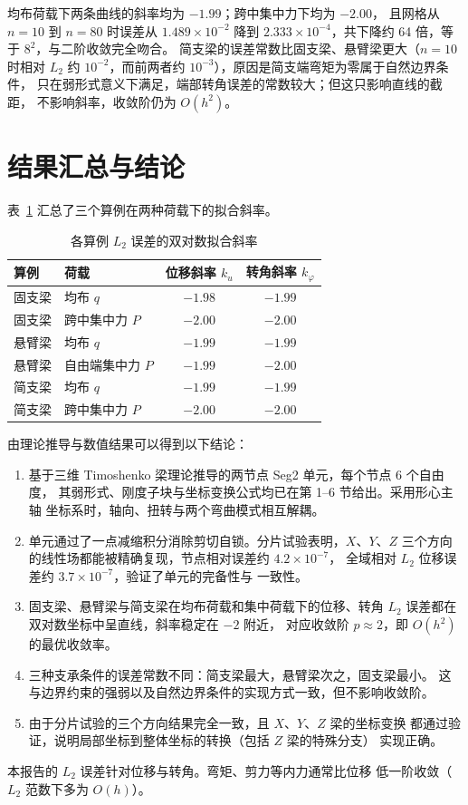 \documentclass[UTF8,a4paper,11pt]{ctexart}
\begin{document}
均布荷载下两条曲线的斜率均为 $-1.99$；跨中集中力下均为 $-2.00$，
且网格从 $n=10$ 到 $n=80$ 时误差从 $1.489\times10^{-2}$ 降到
$2.333\times10^{-4}$，共下降约 64 倍，等于 $8^2$，与二阶收敛完全吻合。
简支梁的误差常数比固支梁、悬臂梁更大（$n=10$ 时相对 $L_2$ 约
$10^{-2}$，而前两者约 $10^{-3}$），原因是简支端弯矩为零属于自然边界条件，
只在弱形式意义下满足，端部转角误差的常数较大；但这只影响直线的截距，
不影响斜率，收敛阶仍为 $O(h^2)$。

\section{结果汇总与结论}

表~\ref{tab:summary} 汇总了三个算例在两种荷载下的拟合斜率。

\begin{table}[H]
\centering
\caption{各算例 $L_2$ 误差的双对数拟合斜率}
\label{tab:summary}
\begin{tabular}{llcc}
\toprule
算例 & 荷载 & 位移斜率 $k_u$ & 转角斜率 $k_\varphi$\\
\midrule
固支梁 & 均布 $q$ & $-1.98$ & $-1.99$\\
固支梁 & 跨中集中力 $P$ & $-2.00$ & $-2.00$\\
悬臂梁 & 均布 $q$ & $-1.99$ & $-1.99$\\
悬臂梁 & 自由端集中力 $P$ & $-1.99$ & $-2.00$\\
简支梁 & 均布 $q$ & $-1.99$ & $-1.99$\\
简支梁 & 跨中集中力 $P$ & $-2.00$ & $-2.00$\\
\bottomrule
\end{tabular}
\end{table}

由理论推导与数值结果可以得到以下结论：
\begin{enumerate}[leftmargin=2em,itemsep=3pt]
  \item 基于三维 Timoshenko 梁理论推导的两节点 Seg2 单元，每个节点 6 个自由度，
        其弱形式、刚度子块与坐标变换公式均已在第 1--6 节给出。采用形心主轴
        坐标系时，轴向、扭转与两个弯曲模式相互解耦。
  \item 单元通过了一点减缩积分消除剪切自锁。分片试验表明，$X$、$Y$、$Z$
        三个方向的线性场都能被精确复现，节点相对误差约 $4.2\times10^{-7}$，
        全域相对 $L_2$ 位移误差约 $3.7\times10^{-7}$，验证了单元的完备性与
        一致性。
  \item 固支梁、悬臂梁与简支梁在均布荷载和集中荷载下的位移、转角
        $L_2$ 误差都在双对数坐标中呈直线，斜率稳定在 $-2$ 附近，
        对应收敛阶 $p\approx2$，即 $O(h^2)$ 的最优收敛率。
  \item 三种支承条件的误差常数不同：简支梁最大，悬臂梁次之，固支梁最小。
        这与边界约束的强弱以及自然边界条件的实现方式一致，但不影响收敛阶。
  \item 由于分片试验的三个方向结果完全一致，且 $X$、$Y$、$Z$ 梁的坐标变换
        都通过验证，说明局部坐标到整体坐标的转换（包括 $Z$ 梁的特殊分支）
        实现正确。
\end{enumerate}

本报告的 $L_2$ 误差针对位移与转角。弯矩、剪力等内力通常比位移
低一阶收敛（$L_2$ 范数下多为 $O(h)$）。
\end{document}
